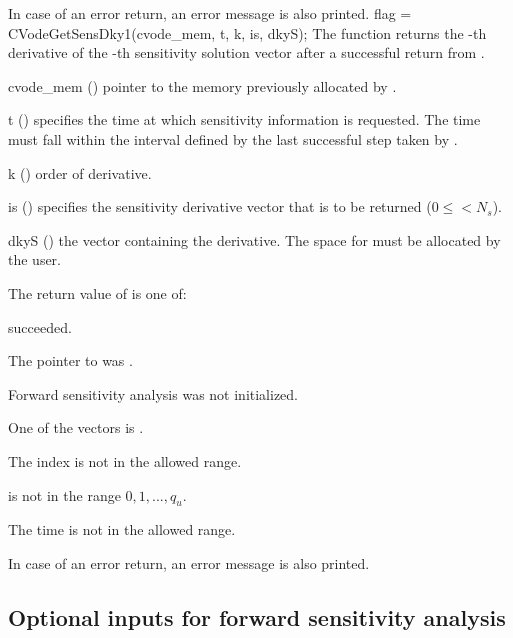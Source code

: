 {
  In case of an error return, an error message is also printed.  
}
{
  flag = CVodeGetSensDky1(cvode\_mem, t, k, is, dkyS);
}
{
  The function  returns the -th derivative of the 
  -th sensitivity solution vector after a successful return from .
}
{
  \begin{args}
  \item[cvode\_mem] ()
    pointer to the memory previously allocated by .
  \item[t] ()
    specifies the time at which sensitivity information is 
    requested. The time  must fall within the interval defined by the last 
    successful step taken by {\cvodes}.
  \item[k] () order of derivative.
  \item[is] () specifies the sensitivity derivative vector that is to be returned
    ($0\le$$< N_s$).
  \item[dkyS] ()
    the vector containing the derivative. The space for  must be allocated by 
    the user. 
  \end{args}
}
{
  The return value  of  is one of:
  \begin{args}
  \item[\Id{CV\_SUCCESS}] 
     succeeded.
  \item[\Id{CV\_MEM\_NULL}] 
    The pointer to  was .
  \item[\Id{CV\_NO\_SENS}] 
    Forward sensitivity analysis was not initialized.
  \item[\Id{CV\_BAD\_DKY}] 
    One of the vectors  is .
  \item[\Id{CV\_BAD\_IS}]
    The index  is not in the allowed range.
  \item[\Id{CV\_BAD\_K}] 
     is not in the range $0, 1, ..., q_u$.
  \item[\Id{CV\_BAD\_T}] 
    The time  is not in the allowed range.
  \end{args}
}
{
  In case of an error return, an error message is also printed.  
}

\subsection{Optional inputs for forward sensitivity analysis}
\label{ss:sens_optional_input}

